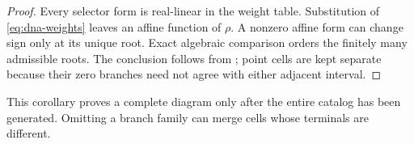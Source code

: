 \begin{proof}
Every selector form is real-linear in the weight table.  Substitution of
\eqref{eq:dna-weights} leaves an affine function of $\rho$.  A nonzero affine
form can change sign only at its unique root.  Exact algebraic comparison
orders the finitely many admissible roots.  The conclusion follows from
; point cells are kept separate because their
zero branches need not agree with either adjacent interval.
\end{proof}

This corollary proves a complete diagram only after the entire catalog has
been generated.  Omitting a branch family can merge cells whose terminals
are different.
